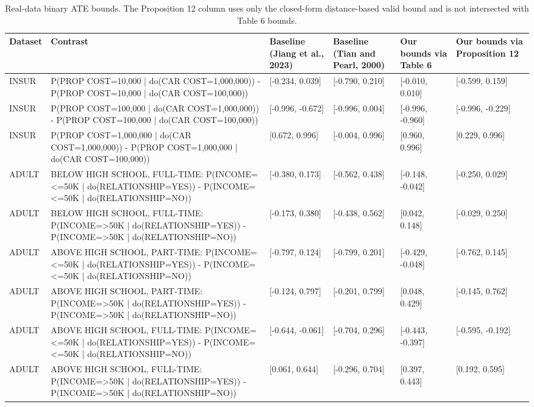 \begin{table}
\caption{Real-data binary ATE bounds. The Proposition 12 column uses only the closed-form distance-based valid bound and is not intersected with Table 6 bounds.}
\label{tab:o2-table7-prop12}
\begin{tabular}{llllll}
\toprule
Dataset & Contrast & Baseline (Jiang et al., 2023) & Baseline (Tian and Pearl, 2000) & Our bounds via Table 6 & Our bounds via Proposition 12 \\
\midrule
INSUR & P(PROP COST=10,000 | do(CAR COST=1,000,000)) - P(PROP COST=10,000 | do(CAR COST=100,000)) & [-0.234, 0.039] & [-0.790, 0.210] & [-0.010, 0.010] & [-0.599, 0.159] \\
INSUR & P(PROP COST=100,000 | do(CAR COST=1,000,000)) - P(PROP COST=100,000 | do(CAR COST=100,000)) & [-0.996, -0.672] & [-0.996, 0.004] & [-0.996, -0.960] & [-0.996, -0.229] \\
INSUR & P(PROP COST=1,000,000 | do(CAR COST=1,000,000)) - P(PROP COST=1,000,000 | do(CAR COST=100,000)) & [0.672, 0.996] & [-0.004, 0.996] & [0.960, 0.996] & [0.229, 0.996] \\
ADULT & BELOW HIGH SCHOOL, FULL-TIME: P(INCOME=<=50K | do(RELATIONSHIP=YES)) - P(INCOME=<=50K | do(RELATIONSHIP=NO)) & [-0.380, 0.173] & [-0.562, 0.438] & [-0.148, -0.042] & [-0.250, 0.029] \\
ADULT & BELOW HIGH SCHOOL, FULL-TIME: P(INCOME=>50K | do(RELATIONSHIP=YES)) - P(INCOME=>50K | do(RELATIONSHIP=NO)) & [-0.173, 0.380] & [-0.438, 0.562] & [0.042, 0.148] & [-0.029, 0.250] \\
ADULT & ABOVE HIGH SCHOOL, PART-TIME: P(INCOME=<=50K | do(RELATIONSHIP=YES)) - P(INCOME=<=50K | do(RELATIONSHIP=NO)) & [-0.797, 0.124] & [-0.799, 0.201] & [-0.429, -0.048] & [-0.762, 0.145] \\
ADULT & ABOVE HIGH SCHOOL, PART-TIME: P(INCOME=>50K | do(RELATIONSHIP=YES)) - P(INCOME=>50K | do(RELATIONSHIP=NO)) & [-0.124, 0.797] & [-0.201, 0.799] & [0.048, 0.429] & [-0.145, 0.762] \\
ADULT & ABOVE HIGH SCHOOL, FULL-TIME: P(INCOME=<=50K | do(RELATIONSHIP=YES)) - P(INCOME=<=50K | do(RELATIONSHIP=NO)) & [-0.644, -0.061] & [-0.704, 0.296] & [-0.443, -0.397] & [-0.595, -0.192] \\
ADULT & ABOVE HIGH SCHOOL, FULL-TIME: P(INCOME=>50K | do(RELATIONSHIP=YES)) - P(INCOME=>50K | do(RELATIONSHIP=NO)) & [0.061, 0.644] & [-0.296, 0.704] & [0.397, 0.443] & [0.192, 0.595] \\
\bottomrule
\end{tabular}
\end{table}
